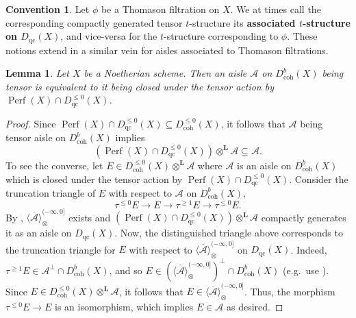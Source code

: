 \documentclass[11pt]{amsart}
\theoremstyle{plain}
\newtheorem{lemma}[theorem]{Lemma}
\theoremstyle{definition}
\newtheorem{convention}[theorem]{Convention}
\numberwithin{equation}{section}
\numberwithin{theorem}{section}
\begin{document}
\begin{convention}
    Let $\phi$ be a Thomason filtration on $X$. We at times call the corresponding compactly generated tensor $t$-structure its \textbf{associated $t$-structure on $D_{\operatorname{qc}}(X)$}, and vice-versa for the $t$-structure corresponding to $\phi$. These notions extend in a similar vein for aisles associated to Thomason filtrations.
\end{convention}

\begin{lemma}
    \label{lem:dbcoh_tensor_via_perfect_tensor}
    Let $X$ be a Noetherian scheme. Then an aisle $\mathcal{A}$ on $D^b_{\operatorname{coh}}(X)$ being tensor is equivalent to it being closed under the tensor action by $\operatorname{Perf}(X)\cap D^{\leq 0}_{\operatorname{qc}}(X)$. 
\end{lemma}

\begin{proof}
    Since $\operatorname{Perf}(X)\cap D^{\leq 0}_{\operatorname{qc}}(X)\subseteq D^{\leq 0}_{\operatorname{coh}}(X)$, it follows that $\mathcal{A}$ being tensor aisle on $D^b_{\operatorname{coh}}(X)$ implies
    \begin{displaymath}
        (\operatorname{Perf}(X)\cap D^{\leq 0}_{\operatorname{qc}}(X) ) \otimes^{\mathbf{L}} \mathcal{A} \subseteq \mathcal{A}.
    \end{displaymath}
    To see the converse, let $E\in D^{\leq 0}_{\operatorname{coh}}(X) \otimes^{\mathbf{L}} \mathcal{A}$ where $\mathcal{A}$ is an aisle on $D^b_{\operatorname{coh}}(X)$ which is closed under the tensor action by $\operatorname{Perf}(X) \cap D^{\leq 0}_{\operatorname{qc}}(X)$. Consider the truncation triangle of $E$ with respect to $\mathcal{A}$ on $D^b_{\operatorname{coh}}(X)$,
    \begin{displaymath}
        \tau^{\leq 0} E \to E \to \tau^{\geq 1} E \to \tau^{\leq 0} E.
    \end{displaymath}
    By \cite[Corollary 3.4 \& Theorem 3.10]{Hrbek/Lank/LeGros/Pavon:2026}, $\overline{\langle \mathcal{A} \rangle}^{(-\infty,0]}_{\otimes}$ exists and $(\operatorname{Perf}(X) \cap D^{\leq 0}_{\operatorname{qc}}(X))\otimes^\mathbf{L} \mathcal{A}$ compactly generates it as an aisle on $D_{\operatorname{qc}}(X)$. Now, the distinguished triangle above corresponds to the truncation triangle for $E$ with respect to $\overline{\langle \mathcal{A} \rangle}^{(-\infty,0]}_{\otimes}$ on $D_{\operatorname{qc}}(X)$. Indeed, $\tau^{\geq 1} E \in \mathcal{A}^\perp \cap D^b_{\operatorname{coh}}(X)$, and so $E\in (\overline{\langle \mathcal{A} \rangle}^{(-\infty,0]}_{\otimes})^\perp \cap D^b_{\operatorname{coh}}(X)$ (e.g.\ use \cite[Lemma 3.1]{AlonsoTarrio/JeremiasLopez/Salorio/Souto:2003}). Since $E\in D^{\leq 0}_{\operatorname{coh}}(X) \otimes^{\mathbf{L}} \mathcal{A}$, it follows that $E\in \overline{\langle \mathcal{A} \rangle}^{(-\infty,0]}_{\otimes}$. Thus, the morphism  $\tau^{\leq 0} E \to E$ is an isomorphism, which implies $E\in \mathcal{A}$ as desired.
\end{proof}
\end{document}
